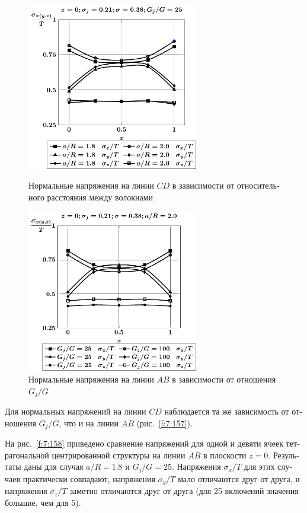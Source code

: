 \begin{russian}
\begin{figure}[h!]
\centering\footnotesize
\parbox[b]{7.5cm}{\centering\includegraphics[width=7.5cm]{inc25-a-h10-r10-g25-z0-cd.pdf}
\caption{Нормальные напряжения на линии $CD$ в зависимости от относительного расстояния между волокнами
\label{f:7:155}}}\hfil\hfil
\parbox[b]{7.5cm}{\centering\includegraphics[width=7.5cm]{inc25-g-a20-h10-r10-z0-ab.pdf}
\caption{Нормальные напряжения на линии $AB$ в зависимости от отношения $G_j/G$ 
\label{f:7:156}}}
\end{figure}

Для нормальных напряжений на линии $CD$ наблюдается та же зависимость от отношения $G_j/G$, что и на линии $AB$ (рис.~\ref{f:7:157}).

На рис.~\ref{f:7:158} приведено сравнение напряжений для одной и девяти ячеек тетрагональной центрированной структуры на линии $AB$ в плоскости $z=0$. Результаты даны для случая $a/R=1.8$ и $G_j/G=25$. Напряжения $\sigma_x/T$ для этих случаев практически совпадают, напряжения $\sigma_y/T$ мало отличаются друг от друга, и напряжения $\sigma_z/T$ заметно отличаются друг от друга (для 25 включений значения большие, чем для 5).


\end{russian}

